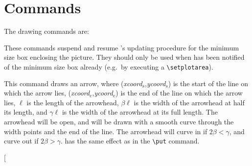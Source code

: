 \section{Commands}
The \PiCTeX{} drawing commands are:
\begin{syntax}
\item[{\tt\linestack[l]{\bsl accountingoff\\
\bsl accountingon}}]
These commands suspend and resume \PiCTeX's updating procedure for the minimum
size box enclosing the picture. They should only be used when \PiCTeX{} has
been notified of
the minimum size box already (e.g.~by executing a \verb+\setplotarea+).
\item[{\tt\bsl arrow <$\ell$> [$\beta$,$\gamma$]
{\rm[}<\emph{xshift},\emph{yshift}>{\rm]} from \emph{xcoord}$_s$ \emph{ycoord}$_s$ to \emph{xcoord}$_e$
\emph{ycoord}$_e$}]
This command draws an arrow, where (\emph{xcoord}$_s$,\emph{ycoord}$_s$) is the start of the
line on which the arrow lies, (\emph{xcoord}$_e$,\emph{ycoord}$_e$) is the end of the line
on which the arrow lies, $\ell$ is the length of the arrowhead, $\beta\ell$ is
the width of the arrowhead at half its length, and $\gamma\ell$ is the width
of the arrowhead at its full length. The arrowhead will be open, and will be
drawn with a smooth curve through the width points and the end of the line.
The arrowhead will curve in if $2\beta < \gamma$, and curve out if
$2\beta > \gamma$.
 has the same effect as in the \verb+\put+ command.
\item[{\tt{}}
\end{syntax}
